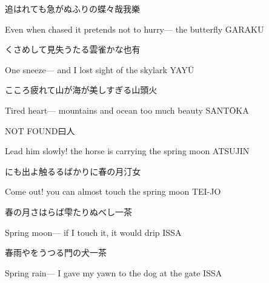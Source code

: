 \begin{haiku}
    {\FH 追はれても急がぬふりの蝶々哉}\hfill{\FH 我樂}

    \vin{} Even when chased
    \vin{} \vin{} it pretends not to hurry---
    \vin{} \vin{} \vin{} the butterfly \hspace{\fill} GARAKU
\end{haiku}

\begin{haiku}
    {\FH くさめして見失うたる雲雀かな}\hfill{\FH 也有}

    \vin{} One sneeze---
    \vin{} \vin{} and I lost sight of
    \vin{} \vin{} \vin{} the skylark \hspace{\fill} YAY\={U}
\end{haiku}

\begin{haiku}
    {\FH こころ疲れて山が海が美しすぎる}\hfill{\FH 山頭火}

    \vin{} Tired heart---
    \vin{} \vin{} mountains and ocean
    \vin{} \vin{} \vin{} too much beauty \hspace{\fill} SANT\={O}KA
\end{haiku}

\begin{haiku}
    {NOT FOUND}\hfill{\FH 曰人}

    \vin{} Lead him slowly!
    \vin{} \vin{} the horse is carrying
    \vin{} \vin{} \vin{} the spring moon \hspace{\fill} ATSUJIN
\end{haiku}

\begin{haiku}
    {\FH {}にも出よ触るるばかりに春の月}\hfill{\FH 汀女}

    \vin{} Come out!
    \vin{} \vin{} you can almost touch
    \vin{} \vin{} \vin{} the spring moon \hspace{\fill} TEI-JO
\end{haiku}

\begin{haiku}
    {\FH 春の月さはらば雫たりぬべし}\hfill{\FH 一茶}

    \vin{} Spring moon---
    \vin{} \vin{} if I touch it, it would
    \vin{} \vin{} \vin{} drip \hspace{\fill} ISSA
\end{haiku}

\begin{haiku}
    {\FH 春雨やをうつる門の犬}\hfill{\FH 一茶}

    \vin{} Spring rain---
    \vin{} \vin{} I gave my yawn
    \vin{} \vin{} \vin{} to the dog at the gate \hspace{\fill} ISSA
\end{haiku}

